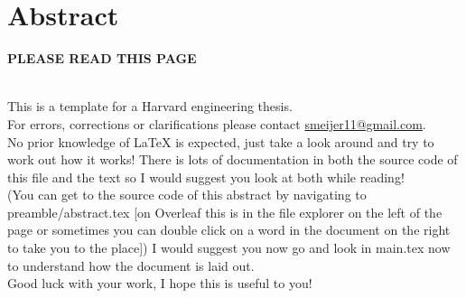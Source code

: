 \chapter*{Abstract}
\Huge
\begin{centering} 
\textbf{PLEASE READ THIS PAGE}
\end{centering}
\normalsize\\
This is a template for a Harvard engineering thesis.\\For errors, corrections or clarifications please contact \href{mailto:smeijer11@gmail.com}{smeijer11@gmail.com}.\\
No prior knowledge of \LaTeX{} is expected, just take a look around and try to work out how it works! There is lots of documentation in both the source code of this file and the text so I would suggest you look at both while reading! \\(You can get to the source code of this abstract by navigating to preamble/abstract.tex [on Overleaf this is in the file explorer on the left of the page or sometimes you can double click on a word in the document on the right to take you to the place]) %
I would suggest you now go and look in main.tex now to understand how the document is laid out.
\\Good luck with your work, I hope this is useful to you!